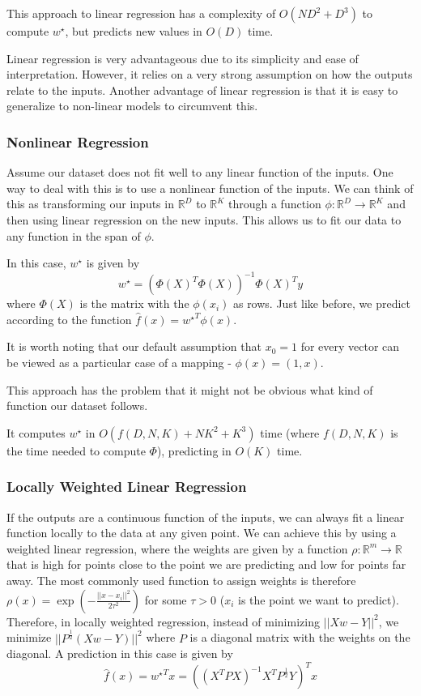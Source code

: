 \documentclass{article}
\newcommand{\R}{\mathbb{R}}
\begin{document}
This approach to linear regression has a complexity of $O(ND^2 + D^3)$ to compute $w^\star$, but predicts new values in $O(D)$ time.

Linear regression is very advantageous due to its simplicity and ease of interpretation.
However, it relies on a very strong assumption on how the outputs relate to the inputs.
Another advantage of linear regression is that it is easy to generalize to non-linear models to circumvent this.

\subsubsection{Nonlinear Regression}

Assume our dataset does not fit well to any linear function of the inputs. 
One way to deal with this is to use a nonlinear function of the inputs.
We can think of this as transforming our inputs in $\R^D$ to $\R^K$ through a function $\phi: \R^D \to \R^K$ and then using linear regression on the new inputs.
This allows us to fit our data to any function in the span of $\phi$.

In this case, $w^\star$ is given by
$$
w^\star = (\Phi(X)^T \Phi(X))^{-1} \Phi(X)^T y
$$
where $\Phi(X)$ is the matrix with the $\phi(x_i)$ as rows.
Just like before, we predict according to the function $\hat{f}(x) = {w^\star}^T \phi(x)$.

It is worth noting that our default assumption that $x_0 = 1$ for every vector can be viewed as a particular case of a mapping - $\phi(x) = (1, x)$.

This approach has the problem that it might not be obvious what kind of function our dataset follows.

It computes $w^\star$ in $O(f(D,N,K) + NK^2 + K^3)$ time (where $f(D,N,K)$ is the time needed to compute $\Phi$), predicting in $O(K)$ time.

\subsubsection{Locally Weighted Linear Regression}

If the outputs are a continuous function of the inputs, we can always fit a linear function locally to the data at any given point.
We can achieve this by using a weighted linear regression, where the weights are given by a function $\rho: \R^m \to \R$ that is high for points close to the point we are predicting and low for points far away.
The most commonly used function to assign weights is therefore $\rho(x) = \exp(-\frac{||x - x_i||^2}{2\tau^2})$ for some $\tau > 0$ ($x_i$ is the point we want to predict).
Therefore, in locally weighted regression, instead of minimizing $||X w - Y||^2$, we minimize $||P^{\frac{1}{2}}(X w - Y)||^2$ where $P$ is a diagonal matrix with the weights on the diagonal.
A prediction in this case is given by
$$
\hat{f}(x) = {w^\star}^T x = ((X^T P X)^{-1} X^T P^{\frac{1}{2}} Y)^T x
$$
\end{document}
